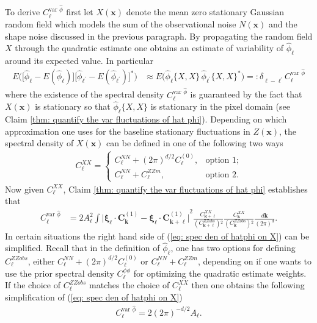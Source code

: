 \documentclass[10pt,noinfoline]{imsart}
\newcommand{\bs}{\boldsymbol}
\begin{document}
To derive $C_{\bs \ell}^{\text{var }\hat\phi}$ first let $X(\bs x)$ denote the mean zero stationary Gaussian random field which models the sum of the observational noise $N(\bs x)$ and the shape noise discussed in the previous paragraph. By propagating the random field $X$ through the quadratic estimate one obtains an estimate of variability of $\hat\phi_{\bs \ell}$ around its expected value. In particular
\begin{align}
E\big(\big[\hat\phi_{\bs \ell}-E(\hat\phi_{\bs \ell})\big]\big[\hat\phi_{\bs \ell^\prime}-E(\hat\phi_{\bs \ell^\prime})\big]^*\big) &\approx E\big(\hat\phi_{\bs \ell}\{X,\!X\} \, \hat\phi_{\bs \ell^\prime}\{X,\!X\}^*\big) =:  \delta^{\phantom{*}}_{\bs \ell-\bs \ell^\prime} C^{\text{var }\hat\phi}_{\bs \ell} \label{var aprox wick form}
\end{align}
where the existence of the spectral density $C^{\text{var }\hat\phi}_{\bs \ell}$ is guaranteed by the fact that $X(\bs x)$ is stationary so that $\hat\phi_{\bs \ell}\{X,X\}$ is stationary in the pixel domain (see Claim \ref{thm: quantify the var fluctuations of hat phi}).
Depending on which approximation one uses for the baseline stationary fluctuations in $Z(\bs x)$, the spectral density of $X(\bs x)$ can be defined in one of the following two ways
\begin{align}\label{Cxx def}
C^{X\!X}_{\bs \ell}=
\begin{cases}
C^{N\!N}_{\bs \ell} + {(2\pi)}^{d/2}C^{(0)}_{\bs \ell}, & \text{option 1;}\\
C^{N\!N}_{\bs \ell} + C^{ZZm}_{\bs \ell}, & \text{option 2.}
\end{cases}
\end{align}
Now given $C^{X\!X}_{\bs \ell}$, Claim \ref{thm: quantify the var fluctuations of hat phi} establishes that
\begin{align}
	\label{eq: spec den of hatphi on X}
	C^{\text{var }\hat\phi}_{\bs \ell} &=
        2 A_{\bs\ell}^2
        \int
        {\Big|\bs\xi_{\bs \ell} \!\cdot\!\bs C^{{(1)}}_{\bs k} - \bs\xi_{\bs \ell} \!\cdot\!\bs C^{{(1)}}_{\bs k+\bs \ell}\Big|}^{2}
        \frac{C^{X\!X}_{\bs k+\bs \ell}}{{(C^{ZZobs}_{\bs k+\bs \ell})}{}^2}
        \frac{C^{X\!X}_{\bs k}}{{(C^{ZZobs}_{\bs k})}{}^2}\frac{d\bs k}{{(2\pi)}^{d}}.
    \end{align}
 In certain situations the right hand side of (\ref{eq: spec den of hatphi on X}) can be simplified. Recall that in the definition of $\hat\phi_{\bs \ell}$, one has two options for defining $C^{ZZobs}_{\bs \ell}$, either $C^{N\!N}_{\bs \ell} + {(2\pi)}^{d/2}C^{(0)}_{\bs \ell}$ or $C^{N\!N}_{\bs \ell} + C^{ZZm}_{\bs \ell}$, depending on if one wants to use the prior spectral density $C^{\phi\phi}_{\bs \ell}$ for optimizing the quadratic estimate weights. If the choice of $C^{ZZobs}_{\bs \ell}$ matches the choice of  $C_{\bs \ell}^{X\!X}$ then one obtains the following simplification of (\ref{eq: spec den of hatphi on X})
\begin{align}
	\label{eq: spec den of hatphi on CZZmobs}
C^{\text{var }\hat\phi}_{\bs \ell} = 2{(2\pi)}^{-d/2} A_{\bs \ell}.
 \end{align}
\end{document}
